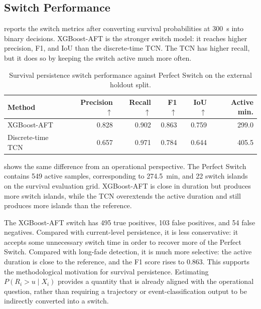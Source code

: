 \subsection{Switch Performance}
\label{sec:results-survival-switch}

 reports the switch metrics after converting
survival probabilities at \SI{300}{s} into binary decisions. XGBoost-AFT is the
stronger switch model: it reaches higher precision, F1, and IoU than the
discrete-time TCN. The TCN has higher recall, but it does so by keeping the
switch active much more often.

\begin{table}[htbp]
  \centering
  \caption{Survival persistence switch performance against Perfect Switch on the external holdout split.}
  \label{tab:survival-switch-results}
  \small
  \setlength{\tabcolsep}{5pt}
  \renewcommand{\arraystretch}{1.15}
  \begin{tabular}{
    @{}
    >{\raggedright\arraybackslash}p{}
    rrrrr
    @{}
  }
    \toprule
    Method & Precision \(\uparrow\) & Recall \(\uparrow\) & F1 \(\uparrow\) & IoU \(\uparrow\) & Active min. \\
    \midrule
    XGBoost-AFT & 0.828 & 0.902 & 0.863 & 0.759 & 299.0 \\
    Discrete-time TCN & 0.657 & 0.971 & 0.784 & 0.644 & 405.5 \\
    \bottomrule
  \end{tabular}
\end{table}

 shows the same difference from an
operational perspective. The Perfect Switch contains 549 active samples,
corresponding to \SI{274.5}{min}, and 22 switch islands on the survival
evaluation grid. XGBoost-AFT is close in duration but produces more switch
islands, while the TCN overextends the active duration and still produces more
islands than the reference.

The XGBoost-AFT switch has 495 true positives, 103 false positives, and 54
false negatives. Compared with current-level persistence, it is less
conservative: it accepts some unnecessary switch time in order to recover more
of the Perfect Switch. Compared with long-fade detection, it is much more
selective: the active duration is close to the reference, and the F1 score rises
to 0.863. This supports the methodological motivation for survival
persistence. Estimating \(P(R_i>u\mid X_i)\) provides a quantity that is already
aligned with the operational question, rather than requiring a trajectory or
event-classification output to be indirectly converted into a switch.

